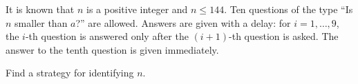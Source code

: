 It is known that $n$ is a positive integer and $n \le 144$. Ten questions of the type “Is $n$ smaller than $a$?” are allowed. Answers are given with a delay: for $i = 1, \ldots , 9$,  the $i$-th question is answered only after the $(i + 1)$-th question is asked. The answer to the tenth question is given immediately.

Find a strategy for identifying $n$.